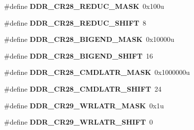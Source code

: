 \begin{DoxyCompactItemize}
\item 
\hypertarget{group___d_d_r___register___masks_gac3839a7ea4140a01359214c2c81dd87d}{}\#define {\bfseries D\+D\+R\+\_\+\+C\+R28\+\_\+\+R\+E\+D\+U\+C\+\_\+\+M\+A\+S\+K}~0x100u\label{group___d_d_r___register___masks_gac3839a7ea4140a01359214c2c81dd87d}

\item 
\hypertarget{group___d_d_r___register___masks_ga2589fd8eb2c71439daf20550c477db3c}{}\#define {\bfseries D\+D\+R\+\_\+\+C\+R28\+\_\+\+R\+E\+D\+U\+C\+\_\+\+S\+H\+I\+F\+T}~8\label{group___d_d_r___register___masks_ga2589fd8eb2c71439daf20550c477db3c}

\item 
\hypertarget{group___d_d_r___register___masks_gaa78c99970a1761df9d749647bbc56d17}{}\#define {\bfseries D\+D\+R\+\_\+\+C\+R28\+\_\+\+B\+I\+G\+E\+N\+D\+\_\+\+M\+A\+S\+K}~0x10000u\label{group___d_d_r___register___masks_gaa78c99970a1761df9d749647bbc56d17}

\item 
\hypertarget{group___d_d_r___register___masks_ga939ebca61808820e8d46f07356e911be}{}\#define {\bfseries D\+D\+R\+\_\+\+C\+R28\+\_\+\+B\+I\+G\+E\+N\+D\+\_\+\+S\+H\+I\+F\+T}~16\label{group___d_d_r___register___masks_ga939ebca61808820e8d46f07356e911be}

\item 
\hypertarget{group___d_d_r___register___masks_ga709f327e745fc76ab4d870ee8107df03}{}\#define {\bfseries D\+D\+R\+\_\+\+C\+R28\+\_\+\+C\+M\+D\+L\+A\+T\+R\+\_\+\+M\+A\+S\+K}~0x1000000u\label{group___d_d_r___register___masks_ga709f327e745fc76ab4d870ee8107df03}

\item 
\hypertarget{group___d_d_r___register___masks_ga1c9f4835e7ce7b815ceac6c1bc78490d}{}\#define {\bfseries D\+D\+R\+\_\+\+C\+R28\+\_\+\+C\+M\+D\+L\+A\+T\+R\+\_\+\+S\+H\+I\+F\+T}~24\label{group___d_d_r___register___masks_ga1c9f4835e7ce7b815ceac6c1bc78490d}

\item 
\hypertarget{group___d_d_r___register___masks_ga1258baae0f4a4cc4d8a2b28d69956521}{}\#define {\bfseries D\+D\+R\+\_\+\+C\+R29\+\_\+\+W\+R\+L\+A\+T\+R\+\_\+\+M\+A\+S\+K}~0x1u\label{group___d_d_r___register___masks_ga1258baae0f4a4cc4d8a2b28d69956521}

\item 
\hypertarget{group___d_d_r___register___masks_ga017ef5d66e89a09787e7c06d8eb58c2d}{}\#define {\bfseries D\+D\+R\+\_\+\+C\+R29\+\_\+\+W\+R\+L\+A\+T\+R\+\_\+\+S\+H\+I\+F\+T}~0\label{group___d_d_r___register___masks_ga017ef5d66e89a09787e7c06d8eb58c2d}


\end{DoxyCompactItemize}
